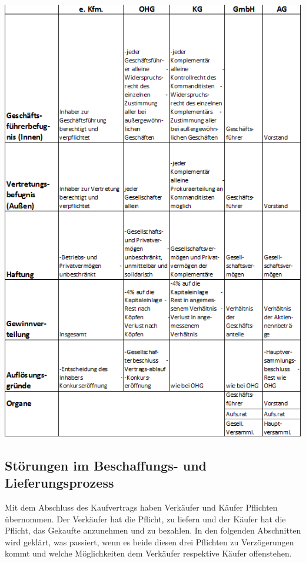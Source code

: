 \includegraphics[scale=1.0]{1jahr_pictures/lf01-pic/lf01-uebersicht_unternehmen_02.png}\newpage


\subsection{Störungen im Beschaffungs- und Lieferungsprozess}
Mit dem Abschluss des Kaufvertrags haben Verkäufer und Käufer Pflichten übernommen. Der Verkäufer hat die Pflicht, zu liefern und der Käufer hat die Pflicht, das Gekaufte anzunehmen und zu bezahlen. In den folgenden Abschnitten wird geklärt, was passiert, wenn es beide diesen drei Pflichten zu Verzögerungen kommt und welche Möglichkeiten dem Verkäufer respektive Käufer offenstehen.\\

